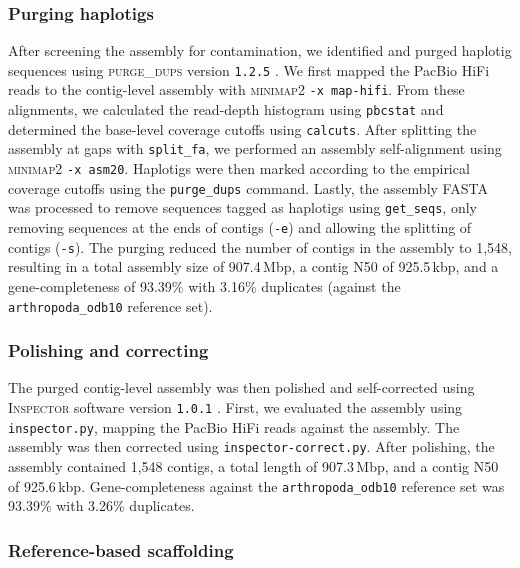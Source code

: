 \subsubsection*{Purging haplotigs}

After screening the assembly for contamination, we identified and purged haplotig
sequences using \textsc{purge\_dups} version \texttt{1.2.5}
\citep{guan_identifying_2020}.
We first mapped the PacBio HiFi reads to the contig-level assembly with
\textsc{minimap2} \texttt{-x map-hifi}.
From these alignments, we calculated the read-depth histogram using \texttt{pbcstat}
and determined the base-level coverage cutoffs using \texttt{calcuts}.
After splitting the assembly at gaps with \texttt{split\_fa}, we performed an
assembly self-alignment using \textsc{minimap2} \texttt{-x asm20}.
Haplotigs were then marked according to the empirical coverage cutoffs using the
\texttt{purge\_dups} command.
Lastly, the assembly FASTA was processed to remove sequences tagged as haplotigs using
\texttt{get\_seqs}, only removing sequences at the ends of contigs (\texttt{-e}) and
allowing the splitting of contigs (\texttt{-s}).
The purging reduced the number of contigs in the assembly to 1{,}548, resulting in
a total assembly size of 907.4\,Mbp, a contig N50 of 925.5\,kbp, and a gene-completeness
of 93.39\% with 3.16\% duplicates (against the \texttt{arthropoda\_odb10} reference
set).

\subsubsection*{Polishing and correcting}

The purged contig-level assembly was then polished and self-corrected using
\textsc{Inspector} software version \texttt{1.0.1} \citep{chen_accurate_2021}.
First, we evaluated the assembly using \texttt{inspector.py}, mapping the PacBio HiFi
reads against the assembly.
The assembly was then corrected using \texttt{inspector-correct.py}.
After polishing, the assembly contained 1{,}548 contigs, a total length of 907.3\,Mbp,
and a contig N50 of 925.6\,kbp.
Gene-completeness against the \texttt{arthropoda\_odb10} reference set was 93.39\%
with 3.26\% duplicates.

\subsubsection*{Reference-based scaffolding}

